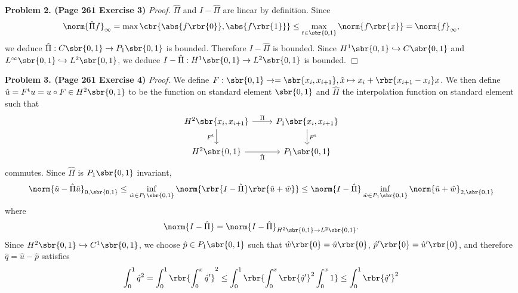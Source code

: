 \documentclass[english, nochinese]{pnote}
\begin{document}
\textbf{Problem 2. (Page 261 Exercise 3)} \textit{Proof.} $\hat{\Pi}$ and $ I - \hat{\Pi} $ are linear by definition. Since
\begin{equation}
\norm{ \hat{\Pi} f }_{\infty} = \max \cbr{ \abs{ f \rbr{0} }, \abs{ f \rbr{1} } } \le \max_{ t \in \sbr{ 0, 1 } } \norm{ f \rbr{x} } = \norm{f}_{\infty},
\end{equation}
we deduce $ \hat{\Pi} : C \sbr{ 0, 1 } \rightarrow P_1 \sbr{ 0, 1 } $ is bounded. Therefore $ I - \hat{\Pi} $ is bounded. Since $ H^1 \sbr{ 0, 1 } \hookrightarrow C \sbr{ 0, 1 } $ and $ L^{\infty} \sbr{ 0, 1 } \hookrightarrow L^2 \sbr{ 0, 1 } $, we deduce $ I - \hat{\Pi} : H^1 \sbr{ 0, 1 } \rightarrow L^2 \sbr{ 0, 1 } $ is bounded.
\hfill$\Box$

\textbf{Problem 3. (Page 261 Exercise 4)} \textit{Proof.} We define $ F : \sbr{ 0, 1 } \rightarrow = \sbr{ x_i, x_{ i + 1 } }, \hat{x} \mapsto x_i + \rbr{ x_{ i + 1 } - x_i } x $. We then define $ \hat{u} = F^{\text{t}} u = u \circ F \in H^2 \sbr{ 0, 1 } $ to be the function on standard element $ \sbr{ 0, 1 } $ and $\hat{\Pi}$ the interpolation function on standard element such that
\begin{equation}
\begin{tikzcd}
H^2 \sbr{ x_i, x_{ i + 1 } } \arrow[r, "\Pi"] \arrow[d, "F^{\text{t}}"'] & P_1 \sbr{ x_i, x_{ i + 1 } } \arrow[d, "F^{\text{t}}"] \\
H^2 \sbr{ 0, 1 } \arrow[r, "\hat{\Pi}"'] & P_1 \sbr{ 0, 1 }
\end{tikzcd}
\end{equation}
commutes. Since $\hat{\Pi}$ is $ P_1 \sbr{ 0, 1 } $ invariant,
\begin{equation}
\norm{ \hat{u} - \hat{\Pi} \hat{u} }_{ 0, \sbr{ 0, 1 } } \le \inf_{ \hat{w} \in P_1 \sbr{ 0, 1 } } \norm{ \rbr{ I - \hat{\Pi} } \rbr{ \hat{u} + \hat{w} } } \le \norm{ I - \hat{\Pi} } \inf_{ \hat{w} \in P_1 \sbr{ 0, 1 } } \norm{ \hat{u} + \hat{w} }_{ 2, \sbr{ 0, 1 } }
\end{equation}
where
\begin{equation}
\norm{ I - \hat{\Pi} } = \norm{ I - \hat{\Pi} }_{ H^2 \sbr{ 0, 1 } \rightarrow L^2 \sbr{ 0, 1 } }.
\end{equation}
Since $ H^2 \sbr{ 0, 1 } \hookrightarrow C^1 \sbr{ 0, 1 } $, we choose $ \hat{p} \in P_1 \sbr{ 0, 1 } $ such that $ \hat{w} \rbr{0} = \hat{u} \rbr{0} $, $ \hat{p}' \rbr{0} = \hat{u}' \rbr{0} $, and therefore $ \hat{q} = \hat{u} - \hat{p} $ satisfies
\begin{equation}
\int_0^1 \hat{q}^2 = \int_0^1 \rbr{ \int_0^x \hat{q}' }^2 \le \int_0^1 \rbr{ \int_0^x \rbr{\hat{q}'}^2 \int_0^x 1 } \le \int_0^1 \rbr{\hat{q}'}^2
\end{equation}
\end{document}
